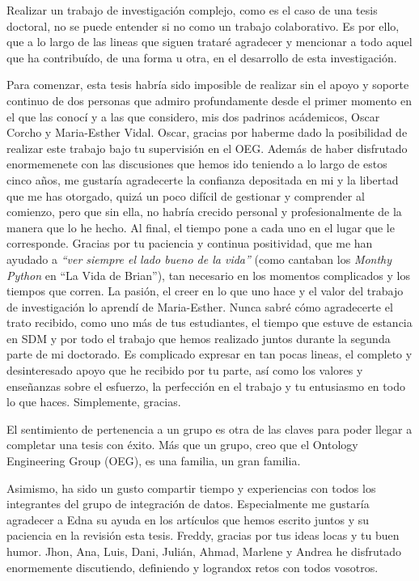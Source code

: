 
\begin{acknowledgementslong} 

Realizar un trabajo de investigación complejo, como es el caso de una tesis doctoral, no se puede entender si no como un trabajo colaborativo. Es por ello, que a lo largo de las lineas que siguen trataré agradecer y mencionar a todo aquel que ha contribuído, de una forma u otra, en el desarrollo de esta investigación.

Para comenzar, esta tesis habría sido imposible de realizar sin el apoyo y soporte continuo de dos personas que admiro profundamente desde el primer momento en el que las conocí y a las que considero, mis dos padrinos acádemicos, Oscar Corcho y Maria-Esther Vidal. Oscar, gracias por haberme dado la posibilidad de realizar este trabajo bajo tu supervisión en el OEG. Además de haber disfrutado enormemenete con las discusiones que hemos ido teniendo a lo largo de estos cinco años, me gustaría agradecerte la confianza depositada en mi y la libertad que me has otorgado, quizá un poco difícil de gestionar y comprender al comienzo, pero que sin ella, no habría crecido personal y profesionalmente de la manera que lo he hecho. Al final, el tiempo pone a cada uno en el lugar que le corresponde. Gracias por tu paciencia y continua positividad, que me han ayudado a \textit{``ver siempre el lado bueno de la vida''} (como cantaban los \textit{Monthy Python} en ``La Vida de Brian''), tan necesario en los momentos complicados y los tiempos que corren. La pasión, el creer en lo que uno hace y el valor del trabajo de investigación lo aprendí de Maria-Esther. Nunca sabré cómo agradecerte el trato recibido, como uno más de tus estudiantes, el tiempo que estuve de estancia en SDM y por todo el trabajo que hemos realizado juntos durante la segunda parte de mi doctorado. Es complicado expresar en tan pocas lineas, el completo y desinteresado apoyo que he recibido por tu parte, así como los valores y enseñanzas sobre el esfuerzo, la perfección en el trabajo y tu entusiasmo en todo lo que haces. Simplemente, gracias. 

El sentimiento de pertenencia a un grupo es otra de las claves para poder llegar a completar una tesis con éxito. Más que un grupo, creo que el Ontology Engineering Group (OEG), es una familia, un gran familia. 

Asimismo, ha sido un gusto compartir tiempo y experiencias con todos los integrantes del grupo de integración de datos. Especialmente me gustaría agradecer a Edna su ayuda en los artículos que hemos escrito juntos y su paciencia en la revisión esta tesis. Freddy, gracias por tus ideas locas y tu buen humor. Jhon, Ana, Luis, Dani, Julián, Ahmad, Marlene y Andrea he disfrutado enormemente discutiendo, definiendo y lograndox retos con todos vosotros. 


\end{acknowledgementslong}

